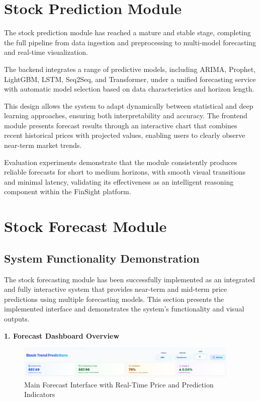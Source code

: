 \section{Stock Prediction Module}
The stock prediction module has reached a mature and stable stage, completing the full pipeline from data ingestion and preprocessing to multi-model forecasting and real-time visualization.  


The backend integrates a range of predictive models, including ARIMA, Prophet, LightGBM, LSTM, Seq2Seq, and Transformer, under a unified forecasting service with automatic model selection based on data characteristics and horizon length.  


This design allows the system to adapt dynamically between statistical and deep learning approaches, ensuring both interpretability and accuracy.  
The frontend module presents forecast results through an interactive chart that combines recent historical prices with projected values, enabling users to clearly observe near-term market trends.  


Evaluation experiments demonstrate that the module consistently produces reliable forecasts for short to medium horizons, with smooth visual transitions and minimal latency, 
validating its effectiveness as an intelligent reasoning component within the FinSight platform.

\section{Stock Forecast Module}

\subsection{System Functionality Demonstration}

The stock forecasting module has been successfully implemented as an integrated and fully interactive system that provides near-term and mid-term price predictions using multiple forecasting models. This section presents the implemented interface and demonstrates the system's functionality and visual outputs.

\textbf{1. Forecast Dashboard Overview}

\begin{figure}[h]
\centering
\includegraphics[width=0.95\textwidth]{images/prediction/four.png}
\caption{Main Forecast Interface with Real-Time Price and Prediction Indicators}
\label{fig:forecast_dashboard}
\end{figure}

